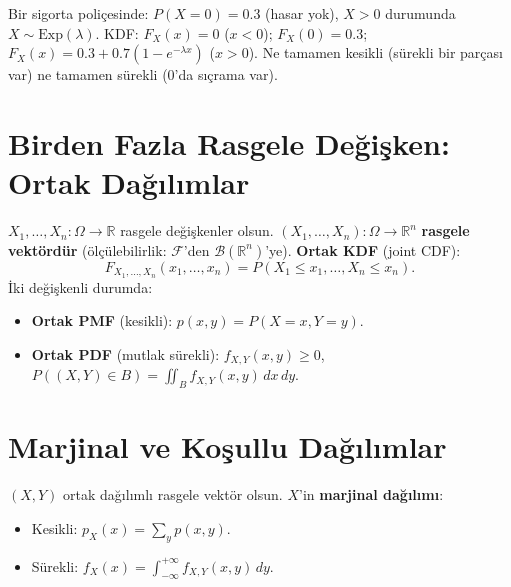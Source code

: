 \begin{ornek}
Bir sigorta poliçesinde:
$P(X = 0) = 0.3$ (hasar yok), $X > 0$ durumunda $X \sim \mathrm{Exp}(\lambda)$.
KDF: $F_X(x) = 0$ ($x < 0$); $F_X(0) = 0.3$; $F_X(x) = 0.3 + 0.7(1 - e^{-\lambda x})$ ($x > 0$).
Ne tamamen kesikli (sürekli bir parçası var) ne tamamen sürekli (0'da sıçrama var).
\end{ornek}

\section{Birden Fazla Rasgele Değişken: Ortak Dağılımlar}
\label{sec:rd_ortak}

\begin{tanim}
\label{def:ortak_kdf}
$X_1, \ldots, X_n : \Omega \to \mathbb{R}$ rasgele değişkenler olsun.
$(X_1, \ldots, X_n) : \Omega \to \mathbb{R}^n$ \textbf{rasgele vektördür}
(ölçülebilirlik: $\mathcal{F}$'den $\mathcal{B}(\mathbb{R}^n)$'ye).
\textbf{Ortak KDF} (joint CDF):
\[
  F_{X_1,\ldots,X_n}(x_1, \ldots, x_n) = P(X_1 \leq x_1, \ldots, X_n \leq x_n).
\]
İki değişkenli durumda:
\begin{itemize}
  \item \textbf{Ortak PMF} (kesikli): $p(x,y) = P(X=x, Y=y)$.
  \item \textbf{Ortak PDF} (mutlak sürekli): $f_{X,Y}(x,y) \geq 0$,
        $P((X,Y) \in B) = \iint_B f_{X,Y}(x,y) \, dx \, dy$.
\end{itemize}
\end{tanim}

\section{Marjinal ve Koşullu Dağılımlar}
\label{sec:marjinal_kosullu}

\begin{tanim}
\label{def:marjinal}
$(X, Y)$ ortak dağılımlı rasgele vektör olsun.
$X$'in \textbf{marjinal dağılımı}:
\begin{itemize}
  \item Kesikli: $p_X(x) = \sum_y p(x, y)$.
  \item Sürekli: $f_X(x) = \int_{-\infty}^{+\infty} f_{X,Y}(x,y) \, dy$.
\end{itemize}
\end{tanim}

